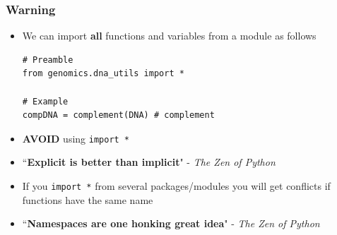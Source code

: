 \documentclass[pdf]{beamer}
\begin{document}
\begin{frame}[fragile]
\frametitle{Warning}

\begin{itemize}\addtolength{\itemsep}{0.8\baselineskip}

\item <1-> We can import \textbf{all} functions and variables from a module as follows
\begin{lstlisting}[style=python]
# Preamble
from genomics.dna_utils import *

# Example
compDNA = complement(DNA) # complement
\end{lstlisting}
\vspace{-0.7cm}
\item<2-> \textbf{AVOID} using \texttt{import *}

\item<3-> ``\textbf{Explicit is better than implicit}" - {\scriptsize \textit{The Zen of Python}}

\item<4-> If you \texttt{import *} from several packages/modules you will get conflicts
if functions have the same name 

\item<5-> ``\textbf{Namespaces are one honking great idea}" - {\scriptsize \textit{The Zen of Python}}

\end{itemize}

\end{frame}
\end{document}
